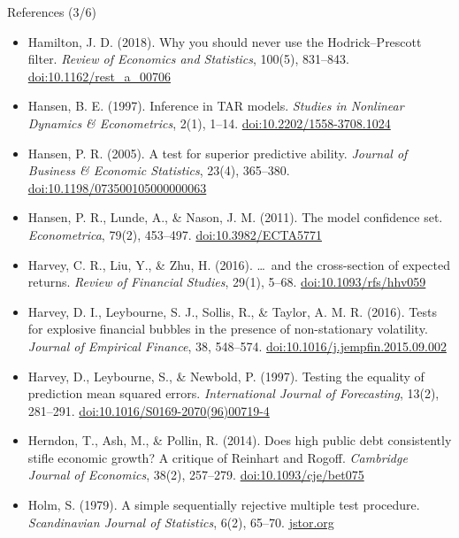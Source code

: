 \begin{frame}{References (3/6)}
\itemsize{\tiny}
\begin{itemize}
    \item Hamilton, J. D. (2018). Why you should never use the Hodrick--Prescott filter. \textit{Review of Economics and Statistics}, 100(5), 831--843. \href{https://doi.org/10.1162/rest_a_00706}{doi:10.1162/rest\_a\_00706}
    \item Hansen, B. E. (1997). Inference in TAR models. \textit{Studies in Nonlinear Dynamics \& Econometrics}, 2(1), 1--14. \href{https://doi.org/10.2202/1558-3708.1024}{doi:10.2202/1558-3708.1024}
    \item Hansen, P. R. (2005). A test for superior predictive ability. \textit{Journal of Business \& Economic Statistics}, 23(4), 365--380. \href{https://doi.org/10.1198/073500105000000063}{doi:10.1198/073500105000000063}
    \item Hansen, P. R., Lunde, A., \& Nason, J. M. (2011). The model confidence set. \textit{Econometrica}, 79(2), 453--497. \href{https://doi.org/10.3982/ECTA5771}{doi:10.3982/ECTA5771}
    \item Harvey, C. R., Liu, Y., \& Zhu, H. (2016). \ldots\ and the cross-section of expected returns. \textit{Review of Financial Studies}, 29(1), 5--68. \href{https://doi.org/10.1093/rfs/hhv059}{doi:10.1093/rfs/hhv059}
    \item Harvey, D. I., Leybourne, S. J., Sollis, R., \& Taylor, A. M. R. (2016). Tests for explosive financial bubbles in the presence of non-stationary volatility. \textit{Journal of Empirical Finance}, 38, 548--574. \href{https://doi.org/10.1016/j.jempfin.2015.09.002}{doi:10.1016/j.jempfin.2015.09.002}
    \item Harvey, D., Leybourne, S., \& Newbold, P. (1997). Testing the equality of prediction mean squared errors. \textit{International Journal of Forecasting}, 13(2), 281--291. \href{https://doi.org/10.1016/S0169-2070(96)00719-4}{doi:10.1016/S0169-2070(96)00719-4}
    \item Herndon, T., Ash, M., \& Pollin, R. (2014). Does high public debt consistently stifle economic growth? A critique of Reinhart and Rogoff. \textit{Cambridge Journal of Economics}, 38(2), 257--279. \href{https://doi.org/10.1093/cje/bet075}{doi:10.1093/cje/bet075}
    \item Holm, S. (1979). A simple sequentially rejective multiple test procedure. \textit{Scandinavian Journal of Statistics}, 6(2), 65--70. \href{https://www.jstor.org/stable/4615733}{jstor.org}

\end{itemize}
\end{frame}
